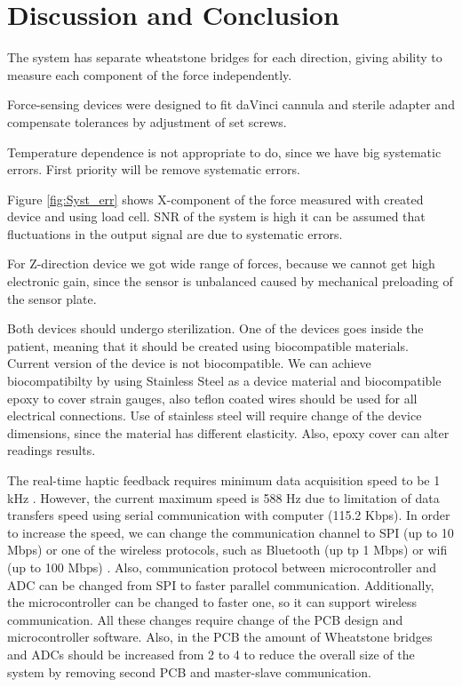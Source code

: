 \chapter{Discussion and Conclusion}
\label{discuss} %

The system has separate wheatstone bridges for each direction, giving ability to measure each component of the force independently. 

	Force-sensing devices were designed to fit daVinci cannula and sterile adapter and compensate tolerances by adjustment of set screws.
	
	Temperature dependence is not appropriate to do, since we have big systematic errors. First priority will be remove systematic errors.

Figure \ref{fig:Syst_err} shows X-component of the force measured with created device and using load cell. SNR of the system is high  it can be assumed that fluctuations in the output signal are due to systematic errors. 

For Z-direction device we got wide range of forces, because we cannot get high electronic gain, since the sensor is unbalanced caused by mechanical preloading of the sensor plate.


	Both devices should undergo sterilization. One of the devices goes inside the patient, meaning that it should be created using biocompatible materials. Current version of the device is not biocompatible. We can achieve biocompatibilty by using Stainless Steel as a device material and biocompatible epoxy to cover strain gauges, also teflon coated wires should be used for all electrical connections. Use of stainless steel will require change of the device dimensions, since the material has different elasticity. Also, epoxy cover can alter readings results.
	
	The real-time haptic feedback requires minimum data acquisition speed to be 1 kHz \cite{seungmoon_choi_effect_2004}. However, the current maximum speed is 588 Hz due to limitation of data transfers speed using serial communication with computer (115.2 Kbps). In order to increase the speed, we can change the communication channel to SPI (up to 10 Mbps) \cite{_uart_porotocol} or one of the wireless protocols, such as Bluetooth (up tp 1 Mbps) or wifi (up to 100 Mbps) \cite{_wireless_protocols}. Also, communication protocol between microcontroller and ADC can be changed from SPI to faster parallel communication. Additionally, the microcontroller can be changed to faster one, so it can support wireless communication. All these changes require change of the PCB design and microcontroller software. Also, in the PCB the amount of Wheatstone bridges and ADCs should be increased from 2 to 4 to reduce the overall size of the system by removing second PCB and master-slave communication.
	
